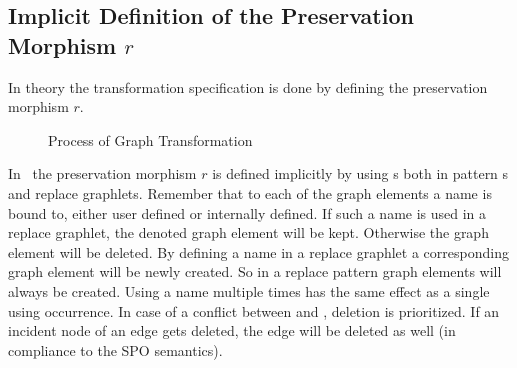 \subsection{Implicit Definition of the Preservation Morphism $r$}
\label{rule:morphismr}
In theory the transformation specification is done by defining the preservation morphism $r$.
\begin{figure}[htbp]
	\centering
  \caption{Process of Graph Transformation}
  \label{rule:figrule}
\end{figure}
In \GrG\, the preservation morphism $r$ is defined implicitly by using s both in pattern s and replace graphlets.
Remember that to each of the graph elements a name is bound to, either user defined or internally defined. If such a name is used in a replace graphlet, the denoted graph element will be kept. 
Otherwise the graph element will be deleted.
By defining a name in a replace graphlet a corresponding graph element will be newly created.
So in a replace pattern  graph elements will always be created.
Using a name multiple times has the same effect as a single using occurrence.
In case of a conflict between  and , deletion is prioritized. 
If an incident node of an edge gets deleted, the edge will be deleted as well (in compliance to the SPO semantics).

